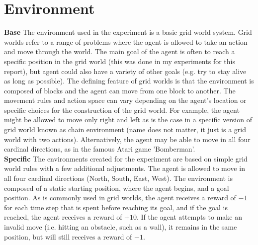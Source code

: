 \documentclass[10pt, letterpaper, twocolumn]{article}
\begin{document}
	\section{Environment}
	
	\noindent \textbf{Base} The environment used in the experiment is a basic grid world system. Grid worlds refer to a range of problems where the agent is allowed to take an action and move through the world. The main goal of the agent is often to reach a specific position in the grid world (this was done in my experiments for this report), but agent could also have a variety of other goals (e.g. try to stay alive as long as possible). The defining feature of grid worlds is that the environment is composed of blocks and the agent can move from one block to another. The movement rules and action space can vary depending on the agent's location or specific choices for the construction of the grid world. For example, the agent might be allowed to move only right and left as is the case in a specific version of grid world known as chain environment (name does not matter, it just is a grid world with two actions). Alternatively, the agent may be able to move in all four cardinal directions, as in the famous Atari game 'Bomberman'.\\
	
	\noindent \textbf{Specific} The environments created for the experiment are based on simple grid world rules with a few additional adjustments. The agent is allowed to move in all four cardinal directions (North, South, East, West). The environment is composed of a static starting position, where the agent begins, and a goal position. As is commonly used in grid worlds, the agent receives a reward of $-1$ for each time step that is spent before reaching its goal, and if the goal is reached, the agent receives a reward of $+10$. If the agent attempts to make an invalid move (i.e. hitting an obstacle, such as a wall), it remains in the same position, but will still receives a reward of $-1$. 
	
\end{document}
